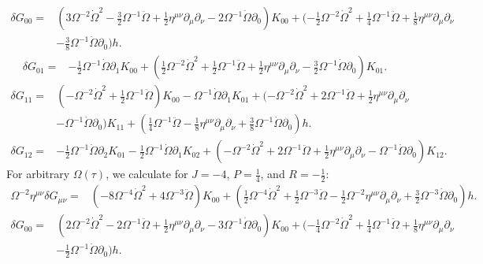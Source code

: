 \documentclass[10pt,letterpaper]{article}
\begin{document}
\begin{align}
\delta G_{00}={}&(3 \Omega^{-2} \dot{\Omega}^2
 -  \tfrac{3}{2} \Omega^{-1} \ddot{\Omega}
 + \tfrac{1}{2} \eta^{\mu \nu} \partial_{\mu} \partial_{\nu}
 - 2 \Omega^{-1} \dot{\Omega} \partial_{0}) K_{00}
 + (- \tfrac{1}{2} \Omega^{-2} \dot{\Omega}^2
 + \tfrac{1}{4} \Omega^{-1} \ddot{\Omega}
 + \tfrac{1}{8} \eta^{\mu \nu} \partial_{\mu} \partial_{\nu}\nonumber\\
& -  \tfrac{3}{8} \Omega^{-1} \dot{\Omega} \partial_{0}) h.
\end{align}
\begin{align}
\delta G_{01}={}&- \tfrac{1}{2} \Omega^{-1} \dot{\Omega} \partial_{1} K_{00}
 + (\tfrac{1}{2} \Omega^{-2} \dot{\Omega}^2
 + \tfrac{1}{2} \Omega^{-1} \ddot{\Omega}
 + \tfrac{1}{2} \eta^{\mu \nu} \partial_{\mu} \partial_{\nu}
 -  \tfrac{3}{2} \Omega^{-1} \dot{\Omega} \partial_{0}) K_{01}.
\end{align}
\begin{align}
\delta G_{11}={}&(- \Omega^{-2} \dot{\Omega}^2
 + \tfrac{1}{2} \Omega^{-1} \ddot{\Omega}) K_{00}
 -  \Omega^{-1} \dot{\Omega} \partial_{1} K_{01}
 + (- \Omega^{-2} \dot{\Omega}^2
 + 2 \Omega^{-1} \ddot{\Omega}
 + \tfrac{1}{2} \eta^{\mu \nu} \partial_{\mu} \partial_{\nu}\nonumber\\
& -  \Omega^{-1} \dot{\Omega} \partial_{0}) K_{11}
 + (\tfrac{1}{4} \Omega^{-1} \ddot{\Omega}
 -  \tfrac{1}{8} \eta^{\mu \nu} \partial_{\mu} \partial_{\nu}
 + \tfrac{3}{8} \Omega^{-1} \dot{\Omega} \partial_{0}) h.
\end{align}
\begin{align}
\delta G_{12}={}&- \tfrac{1}{2} \Omega^{-1} \dot{\Omega} \partial_{2} K_{01}
 -  \tfrac{1}{2} \Omega^{-1} \dot{\Omega} \partial_{1} K_{02}
 + (- \Omega^{-2} \dot{\Omega}^2
 + 2 \Omega^{-1} \ddot{\Omega}
 + \tfrac{1}{2} \eta^{\mu \nu} \partial_{\mu} \partial_{\nu}
 -  \Omega^{-1} \dot{\Omega} \partial_{0}) K_{12}.
\end{align}
For arbitrary $\Omega(\tau)$, we calculate for $J=-4$, $P=\tfrac14$, and $R=-\tfrac12$:
\begin{align}
\Omega^{-2}\eta^{\mu\nu}\delta G_{\mu\nu}={}&(-8 \Omega^{-4} \dot{\Omega}^2
 + 4 \Omega^{-3} \ddot{\Omega}) K_{00}
 + (\tfrac{1}{2} \Omega^{-4} \dot{\Omega}^2
 + \tfrac{1}{2} \Omega^{-3} \ddot{\Omega}
 -  \tfrac{1}{2} \Omega^{-2} \eta^{\mu \nu} \partial_{\mu} \partial_{\nu}
 + \tfrac{3}{2} \Omega^{-3} \dot{\Omega} \partial_{0}) h.
\end{align}
\begin{align}
\delta G_{00}={}&(2 \Omega^{-2} \dot{\Omega}^2
 - 2 \Omega^{-1} \ddot{\Omega}
 + \tfrac{1}{2} \eta^{\mu \nu} \partial_{\mu} \partial_{\nu}
 - 3 \Omega^{-1} \dot{\Omega} \partial_{0}) K_{00}
 + (- \tfrac{1}{4} \Omega^{-2} \dot{\Omega}^2
 + \tfrac{1}{4} \Omega^{-1} \ddot{\Omega}
 + \tfrac{1}{8} \eta^{\mu \nu} \partial_{\mu} \partial_{\nu}\nonumber\\
& -  \tfrac{1}{2} \Omega^{-1} \dot{\Omega} \partial_{0}) h.
\end{align}
\end{document}
